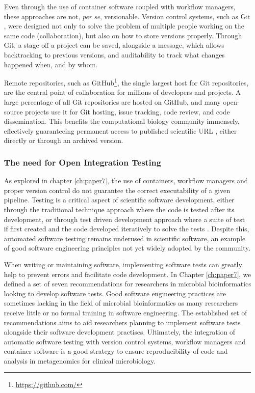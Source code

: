 Even through the use of container software coupled with workflow managers, these approaches are not, \textit{per se}, versionable. Version control systems, such as Git \citep{chacon2014pro}, were designed not only to solve the problem of multiple people working on the same code (collaboration), but also on how to store versions properly. Through Git, a stage off a project can be saved, alongside a message, which allows backtracking to previous versions, and auditability to track what changes happened when, and by whom. 

Remote repositories, such as GitHub\footnote{\url{https://github.com/}}, the single largest host for Git repositories, are the central point of collaboration for millions of developers and projects. A large percentage of all Git repositories are hosted on GitHub, and many open-source projects use it for Git hosting, issue tracking, code review, and code dissemination. This benefits the computational biology community immensely, effectively guaranteeing permanent access to published scientific \ac{URL} \citep{mangul_challenges_2019}, either directly or through an archived version.  

\subsubsection{The need for Open Integration Testing} \label{sssection:integration_testing}

As explored in chapter \ref{ch:paper7}, the use of containers, workflow managers and proper version control do not guarantee the correct executability of a given pipeline. Testing is a critical aspect of scientific software development, either through the traditional technique approach where the code is tested after its development, or through test driven development approach where a suite of test if first created and the code developed iteratively to solve the tests \citep{krafczyk_scientific_2019}. Despite this, automated software testing remains underused in scientific software, an example of good software engineering principles not yet widely adopted by the community. 

When writing or maintaining software, implementing software tests can greatly help to prevent errors and facilitate code development. In Chapter \ref{ch:paper7}, we defined a set of seven recommendations for researchers in microbial bioinformatics looking to develop software tests. Good software engineering practices are sometimes lacking in the field of microbial bioinformatics as many researchers receive little or no formal training in software engineering. The established set of recommendations aims to aid researchers planning to implement software tests alongside their software development practises. Ultimately, the integration of automatic software testing with version control systems, workflow managers and container software is a good strategy to ensure reproducibility of code and analysis in metagenomics for clinical microbiology. 

